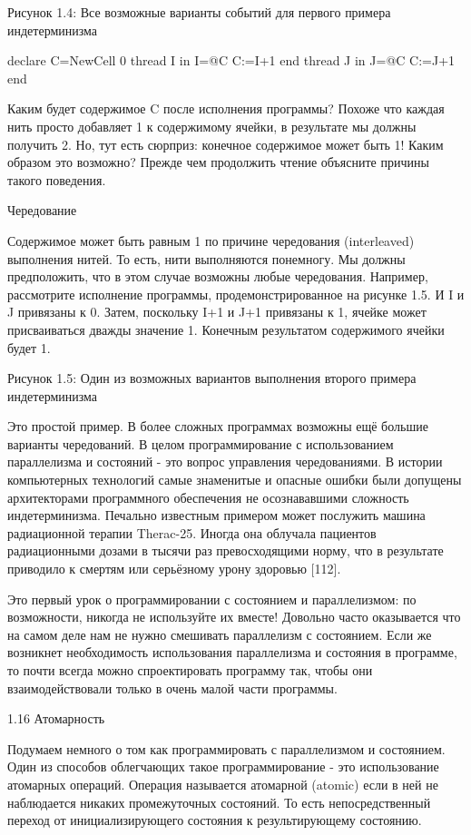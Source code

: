 Рисунок 1.4: Все возможные варианты событий для первого примера индетерминизма

declare
C={NewCell 0}
thread I in
I=@C
C:=I+1
end
thread J in
J=@C
C:=J+1
end

Каким будет содержимое C после исполнения программы? Похоже что каждая нить просто добавляет 1 к содержимому ячейки, в результате мы должны получить 2. Но, тут есть сюрприз: конечное содержимое может быть 1! Каким образом это возможно? Прежде чем продолжить чтение объясните причины такого поведения.

Чередование

Содержимое может быть равным 1 по причине чередования (interleaved) выполнения нитей. То есть, нити выполняются понемногу. Мы должны предположить, что в этом случае возможны любые чередования. Например, рассмотрите исполнение программы, продемонстрированное на рисунке 1.5. И I и J привязаны к 0. Затем, поскольку I+1 и J+1 привязаны к 1, ячейке может присваиваться дважды значение 1. Конечным результатом содержимого ячейки будет 1.

Рисунок 1.5: Один из возможных вариантов выполнения второго примера индетерминизма

Это простой пример. В более сложных программах возможны ещё большие варианты чередований. В целом программирование с использованием параллелизма и состояний - это вопрос управления чередованиями. В истории компьютерных технологий самые знаменитые и опасные ошибки были допущены архитекторами программного обеспечения не осознававшими сложность индетерминизма. Печально известным примером может послужить машина радиационной терапии Therac-25. Иногда она облучала пациентов радиационными дозами в тысячи раз превосходящими норму, что в результате приводило к смертям или серьёзному урону здоровью [112].

Это первый урок о программировании с состоянием и параллелизмом: по возможности, никогда не используйте их вместе! Довольно часто оказывается что на самом деле нам не нужно смешивать параллелизм с состоянием. Если же возникнет необходимость использования параллелизма и состояния в программе, то почти всегда можно спроектировать программу так, чтобы они взаимодействовали только в очень малой части программы.

1.16 Атомарность

Подумаем немного о том как программировать с параллелизмом и состоянием. Один из способов облегчающих такое программирование - это использование атомарных операций. Операция называется атомарной (atomic) если в ней не наблюдается никаких промежуточных состояний. То есть непосредственный переход от инициализирующего состояния к результирующему состоянию.


